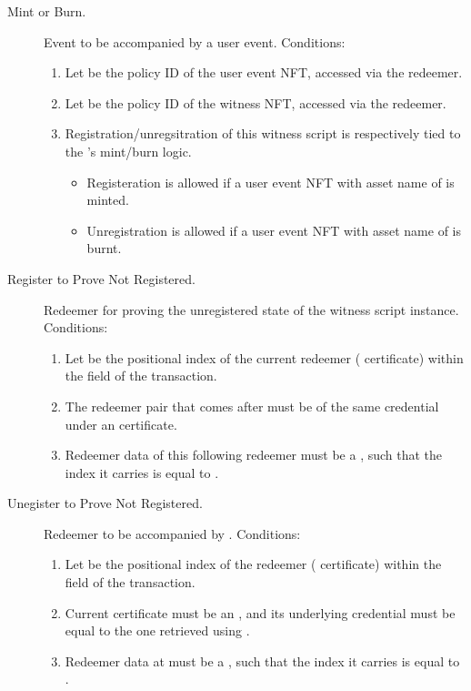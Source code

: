 \documentclass[../midgard.tex]{subfiles}
\begin{document}
\begin{description}
  \item[Mint or Burn.] Event to be accompanied by a user event.
    Conditions:
      \begin{enumerate}
          \item Let  be the policy ID of the user event NFT, accessed via the redeemer.
          \item Let  be the policy ID of the witness NFT, accessed via the redeemer.
          \item Registration/unregsitration of this witness script is respectively tied to the 's mint/burn logic. 
              \begin{itemize}
                  \item Registeration is allowed if a user event NFT with asset name of  is minted.
                  \item Unregistration is allowed if a user event NFT with asset name of  is burnt.
              \end{itemize}
      \end{enumerate}
  \item[Register to Prove Not Registered.] Redeemer for proving the unregistered state of the witness script instance.
    Conditions:
      \begin{enumerate}
          \item Let  be the positional index of the current redeemer ( certificate) within the  field of the transaction.
          \item The redeemer pair that comes after  must be of the same credential under an  certificate.
          \item Redeemer data of this following redeemer must be a , such that the index it carries is equal to .
      \end{enumerate}
  \item[Unegister to Prove Not Registered.] Redeemer to be accompanied by .
    Conditions:
      \begin{enumerate}
          \item Let  be the positional index of the  redeemer ( certificate) within the  field of the transaction.
          \item Current certificate must be an , and its underlying credential must be equal to the one retrieved using .
          \item Redeemer data at  must be a , such that the index it carries is equal to .
      \end{enumerate}
\end{description}
\end{document}
